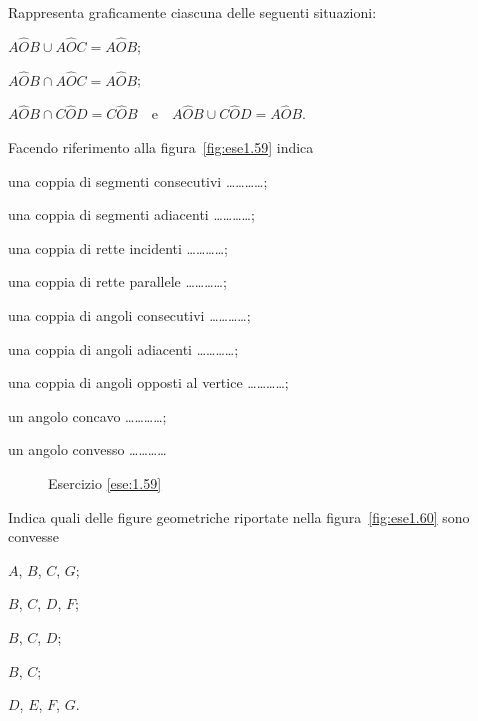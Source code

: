 \begin{esercizio}
Rappresenta graficamente ciascuna delle seguenti situazioni:
\begin{enumeratea}
\item \(A\widehat{O}B\cup A\widehat{O}C=A\widehat{O}B\);
\item \(A\widehat{O}B\cap A\widehat{O}C=A\widehat{O}B\);
\item \(A\widehat{O}B\cap 
C\widehat{O}D=C\widehat{O}B\)~~e~~\(A\widehat{O}B\cup 
C\widehat{O}D=A\widehat{O}B\).
\end{enumeratea}
\end{esercizio}

\begin{esercizio}
Facendo riferimento alla figura~\ref{fig:ese1.59} indica
\begin{enumeratea}
\item una coppia di segmenti consecutivi \ldots\ldots\ldots\ldots{};
\item una coppia di segmenti adiacenti \ldots\ldots\ldots\ldots{};
\item una coppia di rette incidenti \ldots\ldots\ldots\ldots{};
\item una coppia di rette parallele \ldots\ldots\ldots\ldots{};
\item una coppia di angoli consecutivi \ldots\ldots\ldots\ldots{};
\item una coppia di angoli adiacenti \ldots\ldots\ldots\ldots{};
\item una coppia di angoli opposti al vertice 
\ldots\ldots\ldots\ldots{};
\item un angolo concavo \ldots\ldots\ldots\ldots{};
\item un angolo convesso \ldots\ldots\ldots\ldots{}
\end{enumeratea}
\end{esercizio}


\begin{inaccessibleblock}
 \begin{figure}[htb]
 \centering
 \caption{Esercizio \ref{ese:1.59}}%
\end{figure}
\end{inaccessibleblock}

\begin{esercizio}
Indica quali delle figure geometriche riportate nella 
figura~\ref{fig:ese1.60} sono convesse
\begin{multicols}{5}
\begin{enumeratea}
\item \(A\), \(B\), \(C\), \(G\);
\item \(B\), \(C\), \(D\), \(F\);
\item \(B\), \(C\), \(D\);
\item \(B\), \(C\);
\item \(D\), \(E\), \(F\), \(G\).
\end{enumeratea}
\end{multicols}
\end{esercizio}


